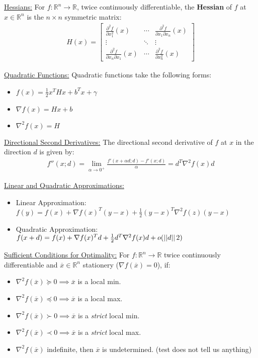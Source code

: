 \documentclass{article}
\newcommand{\norm}[2]{\left\lvert\left\lvert#1\right\rvert\right\rvert}
\newcommand{\sheader}[1]{\underline{#1:}}
\begin{document}
\sheader{Hessians} For $f: \mathbb{R}^n \to \mathbb{R}$, twice continuously differentiable, the \textbf{Hessian}
of $f$ at $x \in \mathbb{R}^n$ is the $n\times n$ symmetric matrix:
\begin{align*}
    H(x) = \begin{bmatrix}
        \frac{\partial^2 f}{\partial x_1^2}(x) & \cdots & \frac{\partial^2 f}{\partial x_1 \partial x_n}(x)\\
        \vdots & \ddots &\vdots \\
        \frac{\partial^2 f}{\partial x_n \partial x_1}(x) & \cdots & \frac{\partial^2 f}{\partial x_n^2}(x)
    \end{bmatrix}
\end{align*}

\sheader{Quadratic Functions} Quadratic functions take the following forms:
\begin{itemize}
    \item $f(x) = \frac{1}{2} x^T Hx + b^T x + \gamma$
    \item $\nabla f(x) = Hx + b$
    \item $\nabla^2 f(x) = H$
\end{itemize}

\sheader{Directional Second Derivatives} The directional second derivative of $f$ at $x$ in the 
direction $d$ is given by:
\begin{align*}
    f''(x;d) = \lim_{\alpha \to 0^+} \frac{f'(x + \alpha d; d) - f'(x; d)}{\alpha} = d^T \nabla^2 f(x)d
\end{align*}

\sheader{Linear and Quadratic Approximations}
\begin{itemize}
    \item Linear Approximation: $f(y) = f(x) + \nabla f(x)^T (y - x) + \frac{1}{2} (y - x)^T \nabla^2 f(z) (y-x)$
    \item Quadratic Approximation: $f(x + d) = f(x) + \nabla f(x)^T d + \frac{1}{2} d^T \nabla^2 f(x)d + o(\norm{d}^2)$
\end{itemize}
\pagebreak 

\sheader{Sufficient Conditions for Optimality} For $f: \mathbb{R}^n \to \mathbb{R}$ twice 
continuously differentiable and $\overline{x} \in \mathbb{R}^n$ stationery ($\nabla f(\overline{x}) = 0$), if:
\begin{itemize}
    \item $\nabla^2 f(\overline{x}) \succeq 0 \implies \overline{x}$ is a local min.
    \item $\nabla^2 f(\overline{x}) \preceq 0 \implies \overline{x}$ is a local max.
    \item $\nabla^2 f(\overline{x}) \succ 0 \implies \overline{x}$ is a \textit{strict} local min.
    \item $\nabla^2 f(\overline{x}) \prec 0 \implies \overline{x}$ is a \textit{strict} local max.
    \item $\nabla^2 f(\overline{x})$ indefinite, then $\overline{x}$ is undetermined. (test does not tell us anything)
\end{itemize}
\end{document}
